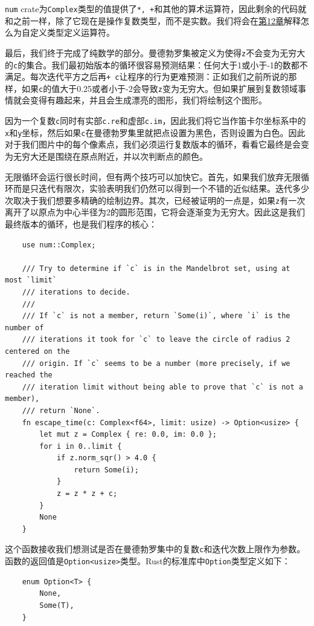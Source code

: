 \texttt{num} crate为\texttt{Complex}类型的值提供了\texttt{*, +}和其他的算术运算符，因此剩余的代码就和之前一样，除了它现在是操作复数类型，而不是实数。我们将会在\hyperref[ch12]{第12章}解释怎么为自定义类型定义运算符。

最后，我们终于完成了纯数学的部分。曼德勃罗集被定义为使得\texttt{z}不会变为无穷大的\texttt{c}的集合。我们最初始版本的循环很容易预测结果：任何大于1或小于-1的数都不满足。每次迭代平方之后再\texttt{+ c}让程序的行为更难预测：正如我们之前所说的那样，如果\texttt{c}的值大于0.25或者小于-2会导致\texttt{z}变为无穷大。但如果扩展到复数领域事情就会变得有趣起来，并且会生成漂亮的图形，我们将绘制这个图形。

因为一个复数\texttt{c}同时有实部\texttt{c.re}和虚部\texttt{c.im}，因此我们将它当作笛卡尔坐标系中的\texttt{x}和\texttt{y}坐标，然后如果\texttt{c}在曼德勃罗集里就把点设置为黑色，否则设置为白色。因此对于我们图片中的每个像素点，我们必须运行复数版本的循环，看看它最终是会变为无穷大还是围绕在原点附近，并以次判断点的颜色。

无限循环会运行很长时间，但有两个技巧可以加快它。首先，如果我们放弃无限循环而是只迭代有限次，实验表明我们仍然可以得到一个不错的近似结果。迭代多少次取决于我们想要多精确的绘制边界。其次，已经被证明的一点是，如果\texttt{z}有一次离开了以原点为中心半径为2的圆形范围，它将会逐渐变为无穷大。因此这是我们最终版本的循环，也是我们程序的核心：
\begin{verbatim}
    use num::Complex;

    /// Try to determine if `c` is in the Mandelbrot set, using at most `limit`
    /// iterations to decide.
    ///
    /// If `c` is not a member, return `Some(i)`, where `i` is the number of
    /// iterations it took for `c` to leave the circle of radius 2 centered on the
    /// origin. If `c` seems to be a number (more precisely, if we reached the
    /// iteration limit without being able to prove that `c` is not a member),
    /// return `None`.
    fn escape_time(c: Complex<f64>, limit: usize) -> Option<usize> {
        let mut z = Complex { re: 0.0, im: 0.0 };
        for i in 0..limit {
            if z.norm_sqr() > 4.0 {
                return Some(i);
            }
            z = z * z + c;
        }
        None
    }
\end{verbatim}

这个函数接收我们想测试是否在曼德勃罗集中的复数\texttt{c}和迭代次数上限作为参数。函数的返回值是\texttt{Option<usize>}类型。Rust的标准库中\texttt{Option}类型定义如下：
\begin{verbatim}
    enum Option<T> {
        None,
        Some(T),
    }
\end{verbatim}

